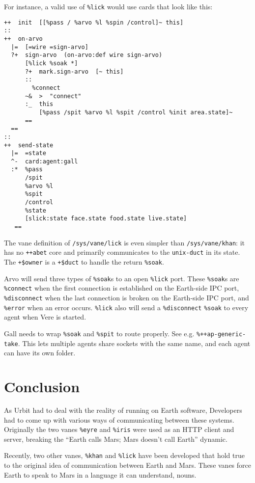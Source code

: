\documentclass[twoside]{article}
\begin{document}
For instance, a valid use of \texttt{\%lick} would use cards that look like this:

\begin{verbatim}
++  init  [[%pass / %arvo %l %spin /control]~ this]
::
++  on-arvo
  |=  [=wire =sign-arvo]
  ?+  sign-arvo  (on-arvo:def wire sign-arvo)
      [%lick %soak *]
      ?+  mark.sign-arvo  [~ this]
      ::
        %connect
      ~&  >  "connect"
      :_  this  
          [%pass /spit %arvo %l %spit /control %init area.state]~
      ==  
  ==
::
++  send-state
  |=  =state
  ^-  card:agent:gall
  :*  %pass 
      /spit 
      %arvo %l 
      %spit 
      /control 
      %state 
      [slick:state face.state food.state live.state]
   ==
\end{verbatim}

The vane definition of \texttt{/sys/vane/lick} is even simpler than \texttt{/sys/vane/khan}:  it has no \texttt{++abet} core and primarily communicates to the \texttt{unix-duct} in its state.  The \texttt{+\$owner} is a \texttt{+\$duct} to handle the return \texttt{\%soak}.

Arvo will send three types of \texttt{\%soak}s to an open \texttt{\%lick} port. These \texttt{\%soak}s are \texttt{\%connect} when the first connection is established on the Earth-side IPC port, \texttt{\%disconnect} when the last connection is broken on the Earth-side IPC port, and \texttt{\%error} when an error occurs. \texttt{\%lick} also will send a \texttt{\%disconnect} \texttt{\%soak} to every agent when Vere is started.

Gall needs to wrap \texttt{\%soak} and \texttt{\%spit} to route properly.  See e.g. \texttt{\%++ap-generic-take}.  This lets multiple agents share sockets with the same name, and each agent can have its own folder.

\section{Conclusion}

As Urbit had to deal with the reality of running on Earth software, Developers had to come up with various ways of communicating between these systems. Originally the two vanes \texttt{\%eyre} and \texttt{\%iris} were used as an HTTP client and server, breaking the ``Earth calls Mars; Mars doesn't call Earth'' dynamic. 

Recently, two other vanes, \texttt{\%khan} and \texttt{\%lick} have been developed that hold true to the original idea of communication between Earth and Mars. These vanes force Earth to speak to Mars in a language it can understand, nouns.



\printbibliography
\end{document}
